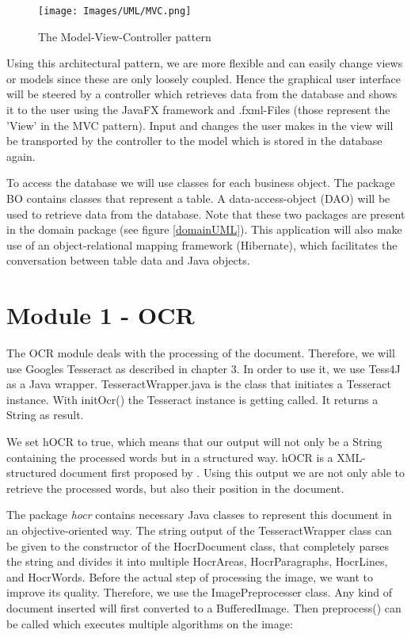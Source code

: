 \begin{figure}[ht!]
\centering
\texttt{[image: Images/UML/MVC.png]}
\caption{The Model-View-Controller pattern \label{MVCpattern}}
\end{figure}

Using this architectural pattern, we are more flexible and can easily change views or models since these are only loosely coupled. Hence the graphical user interface will be steered by a controller which retrieves data from the database and shows it to the user using the JavaFX framework and .fxml-Files (those represent the 'View' in the MVC pattern). Input and changes the user makes in the view will be transported by the controller to the model which is stored in the database again.

To access the database we will use classes for each business object. The package BO contains classes that represent a table. A data-access-object (DAO) will be used to retrieve data from the database. Note that these two packages are present in the domain package (see figure \ref{domainUML}).
This application will also make use of an object-relational mapping framework (Hibernate), which facilitates the conversation between table data and Java objects.

\section{Module 1 - OCR}
\label{sec5.4}

The OCR module deals with the processing of the document. Therefore, we will use Googles Tesseract as described in chapter 3. In order to use it, we use Tess4J as a Java wrapper. TesseractWrapper.java is the class that initiates a Tesseract instance. With initOcr() the Tesseract instance is getting called. It returns a String as result. 

We set hOCR to true, which means that our output will not only be a String containing the processed words but in a structured way. hOCR is a XML-structured document first proposed by \cite{Breuel07}. Using this output we are not only able to retrieve the processed words, but also their position in the document.

The package \emph{hocr} contains necessary Java classes to represent this document in an objective-oriented way. The string output of the TesseractWrapper class can be given to the constructor of the HocrDocument class, that completely parses the string and divides it into multiple HocrAreas, HocrParagraphs, HocrLines, and HocrWords.
Before the actual step of processing the image, we want to improve its quality. Therefore, we use the ImagePreprocesser class. Any kind of document inserted will first converted to a BufferedImage. Then preprocess() can be called which executes multiple algorithms on the image:

